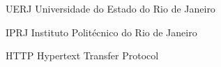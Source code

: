 \begin{siglas}
\item[UERJ] Universidade do Estado do Rio de Janeiro
\item[IPRJ] Instituto Politécnico do Rio de Janeiro
\item[HTTP] Hypertext Transfer Protocol
\end{siglas}
